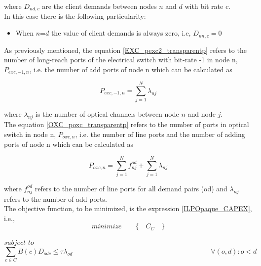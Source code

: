 \vspace{11pt}
\noindent
where $D_{nd,c}$ are the client demands between nodes $n$ and $d$ with bit rate $c$.\\

In this case there is the following particularity:

\begin{itemize}
  \item When $n$=$d$ the value of client demands is always zero, i.e, $D_{nn,c}=0$
\end{itemize}

\vspace{11pt}
As previously mentioned, the equation \ref{EXC_pexc2_transparentp} refers to the number of long-reach ports of the electrical switch with bit-rate -1 in node n, $P_{exc,-1,n}$, i.e. the number of add ports of node n which can be calculated as

\begin{equation}
P_{exc,-1,n} = \sum_{j=1}^{N} \lambda_{nj}
\label{EXC_pexc2_transparentp}
\end{equation}

\vspace{11pt}
\noindent
where $\lambda_{nj}$ is the number of optical channels between node $n$ and node $j$.\\

The equation \ref{OXC_poxc_transparentp} refers to the number of ports in optical switch in node n, $P_{oxc,n}$, i.e. the number of line ports and the number of adding ports of node n which can be calculated as

\begin{equation}
P_{oxc,n} = \sum_{j=1}^{N} f_{nj}^{od} + \sum_{j=1}^{N} \lambda_{nj}
\label{OXC_poxc_transparentp}
\end{equation}

\vspace{11pt}
\noindent
where $f_{nj}^{od}$ refers to the number of line ports for all demand pairs (od) and $\lambda_{nj}$ refers to the number of add ports.\\

The objective function, to be minimized, is the expression \ref{ILPOpaque_CAPEX}, i.e.,
\begin{equation*}
  minimize \qquad \Big\{ \quad C_C \quad \Big\}
\end{equation*}

$subject$ $to$
\begin{equation}
\sum_{c\in C} B\left(c\right) D_{odc} \leq \tau \lambda_{od} \qquad \qquad \qquad \qquad \qquad \qquad \qquad \qquad \qquad \qquad
\forall(o,d) : o < d
\label{ILPTransp0}
\end{equation}

